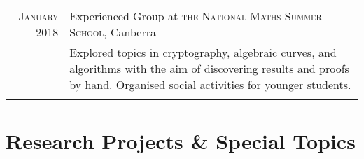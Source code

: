 \documentclass[a4paper,10pt]{article} %
\begin{document}
\begin{tabular}{r|p{12cm}}

\textsc{January 2018} & Experienced Group at \textsc{the National Maths Summer School}, Canberra \emph{}\\
& \footnotesize{Explored topics in cryptography, algebraic curves, and algorithms with the aim of discovering results and proofs by hand. Organised social activities for younger students.}\\
\multicolumn{2}{c}{} \\

\end{tabular}


\section{Research Projects \& Special Topics}
\end{document}

